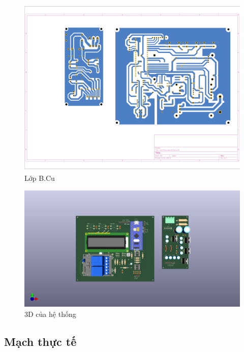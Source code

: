 	\begin{figure}[H]
		\centering
		\includegraphics[width=0.8\linewidth]{./picture/layout_B.pdf}
		\caption{Lớp B.Cu}
		\label{Blayer}
	\end{figure}
	
	\begin{figure}[H]
		\centering
		\includegraphics[width=0.8\linewidth]{./picture/model_3D.png}
		\caption{3D của hệ thống}
		\label{model 3D}
	\end{figure}
	
\subsection{Mạch thực tế}

